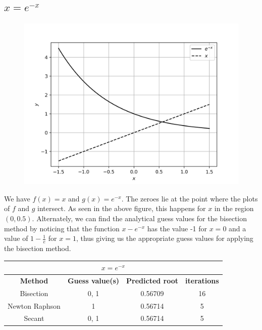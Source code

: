 \documentclass[12,a4paper]{article}
\begin{document}
    \subsection{$x = e^{-x}$}
    \begin{figure}[H]
        \centering
        \includegraphics[width = \textwidth]{plots/p5.png}
        \label{fig:my_label}
    \end{figure}
    We have $f(x) = x$ and $g(x) = e^{-x}$. The zeroes lie at the point where the plots of $f$ and $g$ intersect. As seen in the above figure, this happens for $x$ in the region $(0,0.5)$. Alternately, we can find the analytical guess values for the bisection method by noticing that the function $x - e^{-x}$ has the value -1 for $x = 0$ and a value of $1 - \frac{1}{e}$ for $x = 1$, thus giving us the appropriate guess values for applying the bisection method.
    \begin{table}[h!]
        \centering
        \begin{tabular}{|c|c c c|} 
            \hline
            \multicolumn{4}{|c|}{$x = e^{-x}$}\\
            \hline
            \textbf{Method}&\textbf{Guess value(s)}&\textbf{Predicted root}&\textbf{iterations} \\ [0.5ex] 
            \hline
            Bisection & 0, 1 & 0.56709 & 16 \\ 
            Newton Raphson & 1 & 0.56714 & 5 \\
            Secant & 0, 1 & 0.56714 & 5 \\[1ex] 
            \hline
        \end{tabular}
    \end{table}
\end{document}
